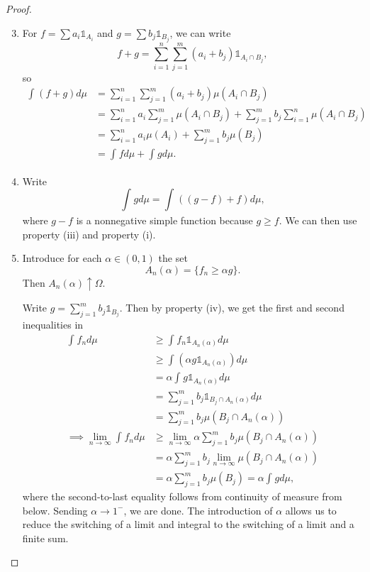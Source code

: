 \begin{proof}
	\begin{enumerate}[label=(\roman*)] \setcounter{enumi}{2}
		\item For $f = \sum a_i \mathds{1}_{A_i}$ and $g = \sum b_j \mathds{1}_{B_j}$, we can write \[
			f+g = \sum\limits_{i=1}^{n} \sum\limits_{j=1}^{m} (a_i + b_j) \mathds{1}_{A_i \cap B_j}
		,\] so 
		\begin{align*}
			\int_{}^{} \left( f+g \right)d\mu &= \sum\limits_{i=1}^{n} \sum\limits_{j=1}^{m} (a_i + b_j) \mu\left( A_i \cap B_j \right) \\
			&= \sum\limits_{i=1}^{n} a_i \sum\limits_{j=1}^{m} \mu\left( A_i \cap B_j \right) + \sum\limits_{j=1}^{m} b_j \sum\limits_{i=1}^{n} \mu\left( A_i \cap B_j \right) \\
			&= \sum\limits_{i=1}^{n} a_i \mu\left( A_i \right) + \sum\limits_{j=1}^{m} b_j \mu(B_j) \\
			&= \int_{}^{} f d\mu + \int_{}^{} gd\mu  
		.\end{align*}
		\item Write \[
			\int_{}^{} gd\mu = \int_{}^{} \left( \left( g-f \right) + f \right)d\mu  
		,\] where $g-f$ is a nonnegative simple function because $g \ge f$. We can then use property (iii) and property (i).
		\item Introduce for each $\alpha \in (0,1)$ the set \[
			A_n (\alpha) = \{f_n \ge \alpha g\}
		.\] Then $A_n(\alpha) \uparrow \Omega$.

		Write $g = \sum_{j=1}^{m}b_j \mathds{1}_{B_j}$. Then by property (iv), we get the first and second inequalities in
		\begin{align*}
			\int_{}^{} f_n d\mu &\ge \int_{}^{} f_n \mathds{1}_{A_n(\alpha)}d\mu \\
								&\ge \int_{}^{}  (\alpha g \mathds{1}_{A_n(\alpha)}) d\mu \\
								&= \alpha \int_{}^{} g \mathds{1}_{A_n(\alpha)}d\mu \\
								&= \sum\limits_{j=1}^{m} b_j \mathds{1}_{B_j \cap A_n(\alpha)} d\mu\\
								&= \sum\limits_{j=1}^{m} b_j \mu\left( B_j \cap A_n(\alpha) \right) \\
			\implies \lim_{n \to \infty} \int_{}^{} f_n d\mu &\ge \lim_{n \to \infty} \alpha \sum\limits_{j=1}^{m} b_j \mu\left( B_j \cap A_n(\alpha) \right) \\
															 &= \alpha \sum\limits_{j=1}^{m} b_j \lim\limits_{n \to \infty} \mu\left( B_j \cap A_n(\alpha) \right) \\
															 &= \alpha \sum\limits_{j=1}^{m} b_j \mu\left( B_j \right) = \alpha \int_{}^{} g d\mu 
		,\end{align*}
		where the second-to-last equality follows from continuity of measure from below. Sending $\alpha \to 1^-$, we are done. The introduction of $\alpha$ allows us to reduce the switching of a limit and integral to the switching of a limit and a finite sum.
	\end{enumerate}
\end{proof}

